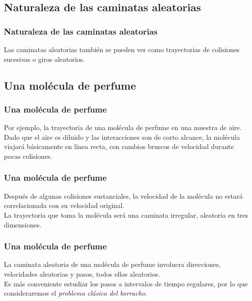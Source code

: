 \subsection*{Naturaleza de las caminatas aleatorias}
\begin{frame}
\frametitle{Naturaleza de las caminatas aleatorias}
Las caminatas aleatorias también se pueden ver como trayectorias de colisiones sucesivas o giros aleatorios.
\end{frame}
\subsection{Una molécula de perfume}
\begin{frame}
\frametitle{Una molécula de perfume}
Por ejemplo, la trayectoria de una molécula de perfume en una muestra de aire.
\\
\bigskip
Dado que el aire es diluido y las interacciones son de corto alcance, la molécula viajará básicamente en línea recta, con cambios bruscos de velocidad durante pocas colisiones.
\end{frame}
\begin{frame}
\frametitle{Una molécula de perfume}
Después de algunas colisiones sustanciales, la velocidad de la molécula no estará correlacionada con su velocidad original.
\\
\bigskip
La trayectoria que toma la molécula será una caminata irregular, aleatoria en tres dimensiones.
\end{frame}
\begin{frame}
\frametitle{Una molécula de perfume}
La caminata aleatoria de una molécula de perfume involucra direcciones, velocidades aleatorias y pasos, todos ellos aleatorios.
\\
\bigskip
Es más conveniente estudiar los pasos a intervalos de tiempo regulares, por lo que consideraremos el \emph{problema clásico del borracho}.
\end{frame}
